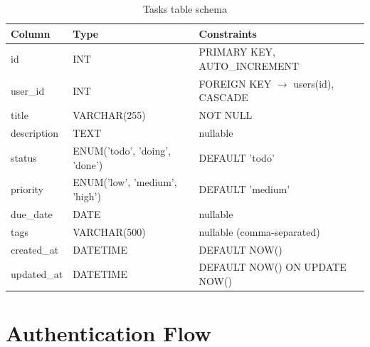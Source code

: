 \documentclass[12pt, a4paper]{article}
\begin{document}
\begin{table}[H]
\centering
\begin{tabularx}{\textwidth}{llX}
\toprule
\textbf{Column} & \textbf{Type} & \textbf{Constraints} \\
\midrule
id          & INT                                   & PRIMARY KEY, AUTO\_INCREMENT \\
user\_id    & INT                                   & FOREIGN KEY $\rightarrow$ users(id), CASCADE \\
title       & VARCHAR(255)                          & NOT NULL \\
description & TEXT                                  & nullable \\
status      & ENUM('todo', 'doing', 'done')         & DEFAULT 'todo' \\
priority    & ENUM('low', 'medium', 'high')         & DEFAULT 'medium' \\
due\_date   & DATE                                  & nullable \\
tags        & VARCHAR(500)                          & nullable (comma-separated) \\
created\_at & DATETIME                              & DEFAULT NOW() \\
updated\_at & DATETIME                              & DEFAULT NOW() ON UPDATE NOW() \\
\bottomrule
\end{tabularx}
\caption{Tasks table schema}
\end{table}

\section{Authentication Flow}
\end{document}
